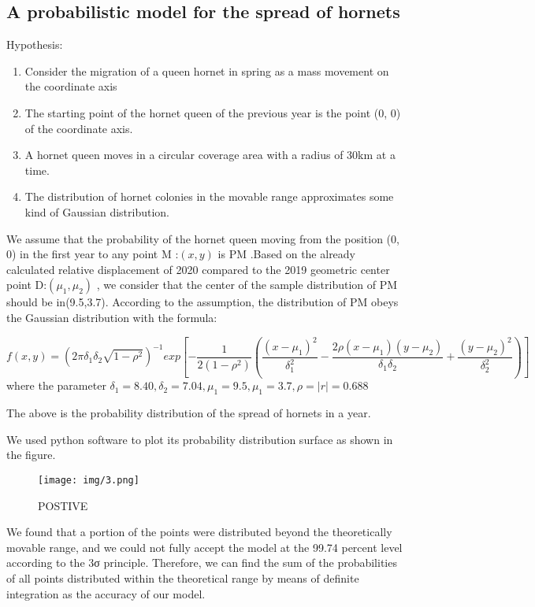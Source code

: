 \documentclass{mcmthesis}
\begin{document}
\subsection{A probabilistic model for the spread of hornets}
Hypothesis:
\begin{enumerate}
    \item Consider the migration of a queen hornet in spring as a mass movement on the coordinate axis
    \item The starting point of the hornet queen of the previous year is the point (0, 0) of the coordinate axis.
    \item A hornet queen moves in a circular coverage area with a radius of 30km at a time.
    \item The distribution of hornet colonies in the movable range approximates some kind of Gaussian distribution.
\end{enumerate}

We assume that the probability of the hornet queen moving from the position (0, 0) in the first year to any point M :$(x, y)$ is PM .Based on the already calculated relative displacement of 2020 compared to the 2019 geometric center point D:$(\mu_1,\mu_2)$ , we consider that the center of the sample distribution of PM should be in(9.5,3.7).
According to the assumption, the distribution of PM obeys the Gaussian distribution with the formula:

\begin{equation}
f(x,y)=(2\pi\delta_1\delta_2\sqrt{1-\rho^2})^{-1} exp[-\frac{1}{2(1-\rho^2)}(\frac{(x-\mu_1)^2}{\delta_1^2}-\frac{2\rho(x-\mu_1)(y-\mu_2)}{\delta_1\delta_2}+\frac{(y-\mu_2)^2}{\delta_2^2})]
\label{2}
\end{equation}
where the parameter $\delta_1=8.40,\delta_2=7.04, \mu_1=9.5,\mu_1=3.7,\rho=|r|=0.688$

The above is the probability distribution of the spread of hornets in a year.

We used python software to plot its probability distribution surface as shown in the figure.

\begin{figure}[H]
    \centering
    \texttt{[image: img/3.png]}
    \caption{POSTIVE}
    \label{POSTIVE}
\end{figure}

We found that a portion of the points were distributed beyond the theoretically movable range, and we could not fully accept the model at the 99.74 percent level according to the 3σ principle. Therefore, we can find the sum of the probabilities of all points distributed within the theoretical range by means of definite integration as the accuracy of our model.
\end{document}
